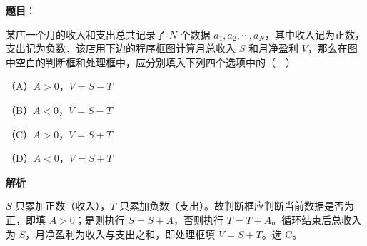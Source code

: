 \begin{answer}

\textbf{题目}：

某店一个月的收入和支出总共记录了 $N$ 个数据 $a_1,a_2,\cdots,a_N$，其中收入记为正数，支出记为负数．该店用下边的程序框图计算月总收入 $S$ 和月净盈利 $V$，那么在图中空白的判断框和处理框中，应分别填入下列四个选项中的（　）

（A）$A>0$，$V=S-T$

（B）$A<0$，$V=S-T$

（C）$A>0$，$V=S+T$

（D）$A<0$，$V=S+T$
\nopagebreak[4]
\begin{center}\end{center}
\nopagebreak[4]
\textbf{解析}

$S$ 只累加正数（收入），$T$ 只累加负数（支出）。故判断框应判断当前数据是否为正，即填 $A>0$；是则执行 $S=S+A$，否则执行 $T=T+A$。循环结束后总收入为 $S$，月净盈利为收入与支出之和，即处理框填 $V=S+T$。选 C。


\end{answer}
